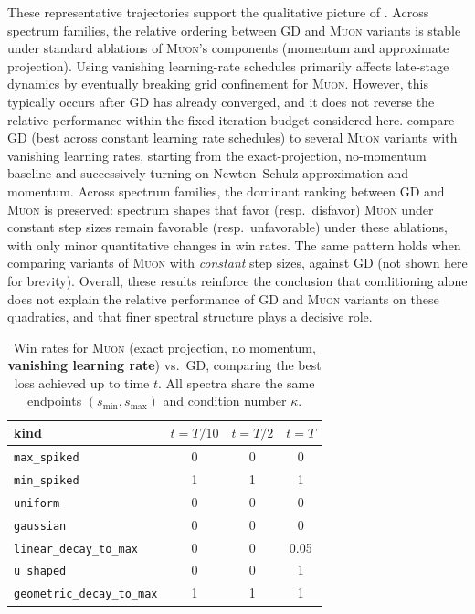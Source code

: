 \documentclass{article}
\theoremstyle{plain}
\theoremstyle{definition}
\theoremstyle{remark}
\newcommand{\GD}{\textsc{GD}}
\newcommand{\Muon}{\textsc{Muon}}
\begin{document}
These representative trajectories support the qualitative picture of
. 
Across spectrum families, the relative ordering between \GD{} and \Muon{}
variants is stable under standard ablations of \Muon{}'s components
(momentum and approximate projection). 
Using vanishing learning-rate schedules primarily affects late-stage dynamics
by eventually breaking grid confinement for \Muon{}.
However, this typically occurs after \GD{} has already converged,
and it does not reverse the relative performance within the fixed iteration
budget considered here.
compare \GD{} (best across constant learning rate schedules) to several \Muon{} variants with vanishing learning rates,
starting from the exact-projection, no-momentum baseline and successively
turning on Newton--Schulz approximation and momentum.
Across spectrum families, the dominant ranking between \GD{} and \Muon{}
is preserved: spectrum shapes that favor (resp.\ disfavor) \Muon{} under
constant step sizes remain favorable (resp.\ unfavorable) under these
ablations, with only minor quantitative changes in win rates. 
The same pattern holds when comparing variants of \Muon{} with \emph{constant} 
step sizes, against \GD{} (not shown here for brevity). 
Overall, these results reinforce the conclusion that conditioning alone does
not explain the relative performance of \GD{} and \Muon{} variants on these quadratics, and that
finer spectral structure plays a decisive role.

\begin{table}[H]
\centering
\small
\setlength{\tabcolsep}{3pt}
\renewcommand{\arraystretch}{1.15}
\caption{Win rates for \Muon{} (exact projection, no momentum, \textbf{vanishing learning rate})
vs.\ \GD{}, comparing the best loss achieved up to time $t$.
All spectra share the same endpoints $(s_{\min},s_{\max})$ and condition number $\kappa$.}
\label{tab:vanishing-exact-nomom}
\begin{tabular}{lccc}
\toprule
kind & $t=T/10$ & $t=T/2$ & $t=T$ \\
\midrule
\texttt{max\_spiked}              & 0   & 0   & 0   \\
\texttt{min\_spiked}              & 1   & 1   & 1   \\
\texttt{uniform}                & 0   & 0   & 0   \\
\texttt{gaussian}               & 0   & 0   & 0   \\
\texttt{linear\_decay\_to\_max} & 0   & 0   & 0.05\\
\texttt{u\_shaped}       & 0   & 0   & 1   \\
\texttt{geometric\_decay\_to\_max}          & 1   & 1   & 1   \\
\bottomrule
\end{tabular}
\end{table}
\end{document}

